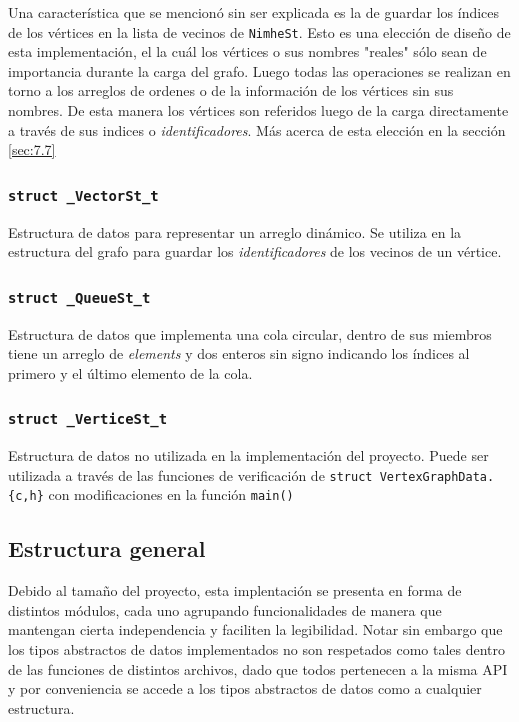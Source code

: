 \documentclass[11pt,a4paper]{article}
\theoremstyle{plain}
\begin{document}
\begin{itemize}
Una característica que se mencionó sin ser explicada es la de guardar los índices de los vértices en la lista de vecinos de \texttt{NimheSt}. Esto es una elección de diseño de esta implementación, el la cuál los vértices o sus nombres "reales" sólo sean de importancia durante la carga del grafo. Luego todas las operaciones se realizan en torno a los arreglos de ordenes o de la información de los vértices sin sus nombres. De esta manera los vértices son referidos luego de la carga directamente a través de sus indices o \emph{identificadores}. Más acerca de esta elección en la sección \ref{sec:7.7}

\end{itemize}
	
		\subsubsection{\texttt{struct \_VectorSt\_t}}

Estructura de datos para representar un arreglo dinámico. Se utiliza en la estructura del grafo para guardar los \emph{identificadores} de los vecinos de un vértice.

		\subsubsection{\texttt{struct \_QueueSt\_t}}

Estructura de datos que implementa una cola circular, dentro de sus miembros tiene un arreglo de \emph{elements} y dos enteros sin signo indicando los índices al primero y el último elemento de la cola.

		\subsubsection{\texttt{struct \_VerticeSt\_t}}

Estructura de datos no utilizada en la implementación del proyecto. Puede ser utilizada a través de las funciones de verificación de \texttt{struct VertexGraphData.\{c,h\}} con modificaciones en la función \texttt{main()}

		\subsection{Estructura general}

Debido al tamaño del proyecto, esta implentación se presenta en forma de distintos módulos, cada uno agrupando funcionalidades de manera que mantengan cierta independencia y faciliten la legibilidad. Notar sin embargo que los tipos abstractos de datos implementados no son respetados como tales dentro de las funciones de distintos archivos, dado que todos pertenecen a la misma API y por conveniencia se accede a los tipos abstractos de datos como a cualquier estructura.
\end{document}
